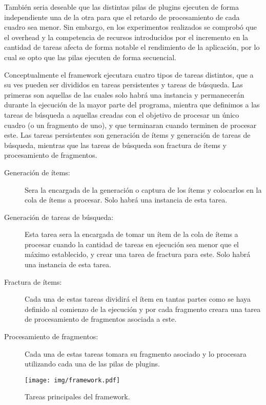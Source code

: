 También seria deseable que las distintas pilas de plugins ejecuten de forma
independiente una de la otra para que el retardo de procesamiento de cada cuadro
sea menor. Sin embargo, en los experimentos realizados se comprobó que el
overhead y la competencia de recursos introducidos por el incremento en la
cantidad de tareas afecta de forma notable el rendimiento de la aplicación, por
lo cual se opto que las pilas ejecuten de forma secuencial.

Conceptualmente el framework ejecutara cuatro tipos de tareas distintos, que a
su ves pueden ser divididos en tareas persistentes y tareas de búsqueda. Las
primeras son aquellas de las cuales solo habrá una instancia y permanecerán
durante la ejecución de la mayor parte del programa, mientra que definimos a las
tareas de búsqueda a aquellas creadas con el objetivo de procesar un único
cuadro (o un fragmento de uno), y que terminaran cuando terminen de procesar
este. Las tareas persistentes son generación de ítems y generación de tareas de
búsqueda, mientras que las tareas de búsqueda son fractura de ítems y
procesamiento de fragmentos.

\begin{description}

\item[Generación de ítems:] Sera la encargada de la generación o captura de los
	ítems y colocarlos en la cola de ítems a procesar. Solo habrá una
	instancia de esta tarea.

\item[Generación de tareas de búsqueda:] Esta tarea sera la encargada de tomar
	un ítem de la cola de ítems a procesar cuando la cantidad de tareas en
	ejecución sea menor que el máximo establecido, y crear una tarea de
	fractura para este. Solo habrá una instancia de esta tarea.

\item[Fractura de ítems:] Cada una de estas tareas dividirá el ítem en tantas
	partes como se haya definido al comienzo de la ejecución y por cada
	fragmento creara una tarea de procesamiento de fragmentos asociada a
	este.

\item[Procesamiento de fragmentos:] Cada una de estas tareas tomara su fragmento
	asociado y lo procesara utilizando cada una de las pilas de plugins.

\end{description}

\begin{figure}[!h]

	\texttt{[image: img/framework.pdf]}

	\caption{Tareas principales del framework.}

\end{figure}

